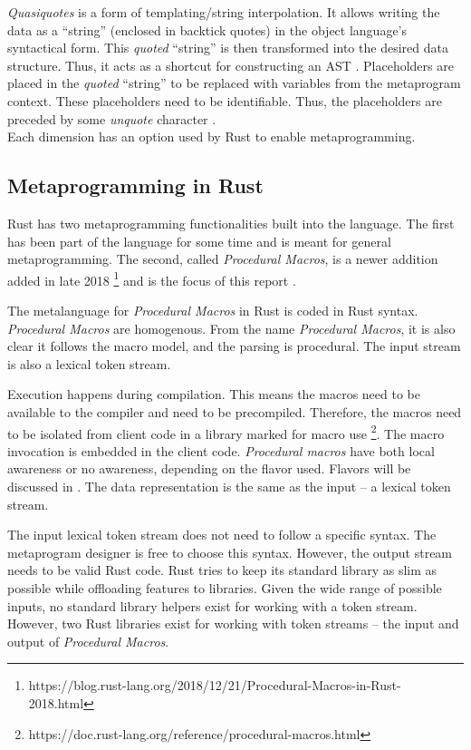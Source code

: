 \textit{Quasiquotes} is a form of templating/string interpolation.
It allows writing the data as a ``string'' (enclosed in backtick quotes) in the object language's syntactical form.
This \textit{quoted} ``string'' is then transformed into the desired data structure.
Thus, it acts as a shortcut for constructing an AST \cite{lilis_15_01}.
Placeholders are placed in the \textit{quoted} ``string'' to be replaced with variables from the metaprogram context.
These placeholders need to be identifiable.
Thus, the placeholders are preceded by some \textit{unquote} character \cite{bawden_99_01}.\\

Each dimension has an option used by Rust to enable metaprogramming.

\subsection{Metaprogramming in Rust}
\label{sec:rust-metaprogramming}
Rust has two metaprogramming functionalities built into the language.
The first has been part of the language for some time and is meant for general metaprogramming.
The second, called \textit{Procedural Macros}, is a newer addition added in late 2018 \footnote{https://blog.rust-lang.org/2018/12/21/Procedural-Macros-in-Rust-2018.html} and is the focus of this report \cite{klabnik_2019_01}.

The metalanguage for \textit{Procedural Macros} in Rust is coded in Rust syntax.
\textit{Procedural Macros} are homogenous.
From the name \textit{Procedural Macros}, it is also clear it follows the macro model, and the parsing is procedural.
The input stream is also a lexical token stream.

Execution happens during compilation.
This means the macros need to be available to the compiler and need to be precompiled.
Therefore, the macros need to be isolated from client code in a library marked for macro use \footnote{https://doc.rust-lang.org/reference/procedural-macros.html}.
The macro invocation is embedded in the client code.
\textit{Procedural macros} have both local awareness or no awareness, depending on the flavor used.
Flavors will be discussed in .
The data representation is the same as the input -- a lexical token stream.

The input lexical token stream does not need to follow a specific syntax.
The metaprogram designer is free to choose this syntax.
However, the output stream needs to be valid Rust code.
Rust tries to keep its standard library as slim as possible while offloading features to libraries.
Given the wide range of possible inputs, no standard library helpers exist for working with a token stream.
However, two Rust libraries exist for working with token streams -- the input and output of \textit{Procedural Macros}.

